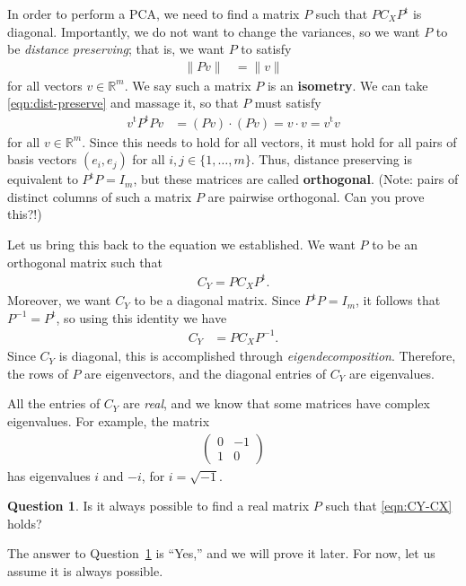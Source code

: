 \documentclass[a4paper, 12pt]{article}
\numberwithin{equation}{section}
\numberwithin{figure}{section}
\theoremstyle{definition}
\newtheorem{quest}[thm]{Question}
\newcommand{\R}{\mathbb{R}}
\newcommand{\tr}{\mathrm{t}}
\newcommand{\WEEK}[1]{%
\hfill Week #1

\vspace{-1em}

\begin{center}
	\rule{\textwidth}{2pt}
\end{center}
\vspace{0.5em}%
}
\begin{document}
In order to perform a PCA, we need to find a matrix $P$ such that $PC_XP^{\tr}$
is diagonal. Importantly, we do not want to change the variances, so we want $P$
to be \textit{distance preserving}; that is, we want $P$ to satisfy
\begin{align}\label{eqn:dist-preserve}
	\| Pv \| &= \| v\|
\end{align}
for all vectors $v\in\R^m$. We say such a matrix $P$ is an \textbf{isometry}. We
can take \eqref{eqn:dist-preserve} and massage it, so that $P$ must satisfy 
\begin{align*}
	v^{\tr} P^{\tr} P v &= (Pv)\cdot (Pv) = v\cdot v = v^{\tr} v
\end{align*}
for all $v\in \R^m$. Since this needs to hold for all vectors, it must hold for
all pairs of basis vectors $(e_i,e_j)$ for all $i,j\in\{1,\dots, m\}$. Thus,
distance preserving is equivalent to $P^{\tr}P = I_m$, but these matrices are
called \textbf{orthogonal}. (Note: pairs of distinct columns of such a matrix
$P$ are pairwise orthogonal. Can you prove this?!) 


Let us bring this back to the equation we established. We want $P$ to be an
orthogonal matrix such that 
\begin{align}\label{eqn:CY-CX}
	C_Y = PC_XP^{\tr} .
\end{align} 
Moreover, we want $C_Y$ to be a diagonal matrix. Since $P^{\tr}P=I_m$, it
follows that $P^{-1} = P^{\tr}$, so using this identity we have 
\begin{align*}
	C_Y &= PC_XP^{-1}.
\end{align*}
Since $C_Y$ is diagonal, this is accomplished through
\textit{eigendecomposition}. Therefore, the rows of $P$ are eigenvectors, and
the diagonal entries of $C_Y$ are eigenvalues.

All the entries of $C_Y$ are \textit{real}, and we know that some matrices have
complex eigenvalues. For example, the matrix 
\begin{align*}
	\begin{pmatrix}
		0 & -1 \\ 1 & 0 
	\end{pmatrix}
\end{align*}
has eigenvalues $i$ and $-i$, for $i=\sqrt{-1}$. 
\begin{quest}\label{quest:PCA-possible}
	Is it always possible to find a real matrix $P$ such that \eqref{eqn:CY-CX}
	holds?
\end{quest}
The answer to Question~\ref{quest:PCA-possible} is ``Yes,'' and we will prove it later.
For now, let us assume it is always possible. 
\end{document}
